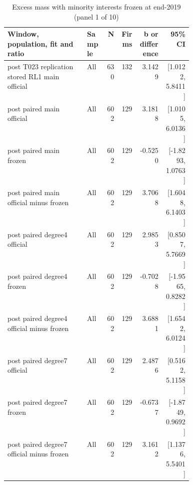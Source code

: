 \begin{table}[!htbp]\centering\scriptsize
\caption{Excess mass with minority interests frozen at end-2019 (panel 1 of 10)}
\begin{threeparttable}
\begin{tabular}{p{0.43\linewidth}lrrrr}
\toprule
Window, population, fit and ratio & Sample & N & Firms & b or difference & 95\% CI \\
\midrule
post T023 replication stored RL1 main official & All & 630 & 132 & 3.1429 & [1.0122, 5.8411] \\
post paired main official & All & 602 & 129 & 3.1818 & [1.0105, 6.0136] \\
post paired main frozen & All & 602 & 129 & -0.5250 & [-1.8293, 1.0763] \\
post paired main official minus frozen & All & 602 & 129 & 3.7068 & [1.6048, 6.1403] \\
post paired degree4 official & All & 602 & 129 & 2.9853 & [0.8507, 5.7669] \\
post paired degree4 frozen & All & 602 & 129 & -0.7028 & [-1.9565, 0.8282] \\
post paired degree4 official minus frozen & All & 602 & 129 & 3.6881 & [1.6542, 6.0124] \\
post paired degree7 official & All & 602 & 129 & 2.4876 & [0.5162, 5.1158] \\
post paired degree7 frozen & All & 602 & 129 & -0.6737 & [-1.8749, 0.9692] \\
post paired degree7 official minus frozen & All & 602 & 129 & 3.1612 & [1.1376, 5.5401] \\
\bottomrule
\end{tabular}
\begin{tablenotes}[flushleft]\footnotesize

\end{tablenotes}
\end{threeparttable}
\end{table}

